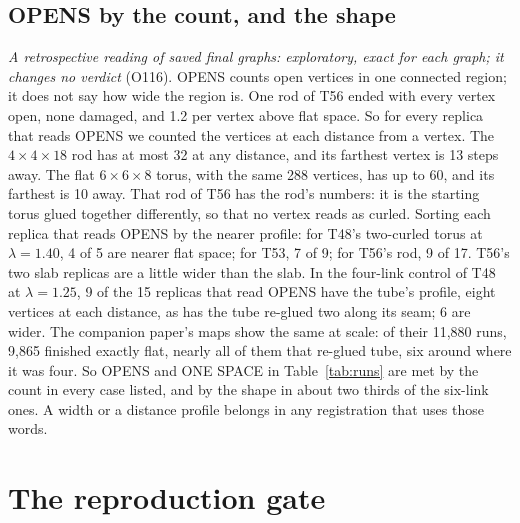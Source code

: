 \documentclass[aps,pre,10pt,twocolumn,superscriptaddress,nofootinbib]{revtex4-2}
\begin{document}
\subsection{OPENS by the count, and the shape}
\label{sec:shape}

\emph{A retrospective reading of saved final graphs: exploratory, exact for each graph; it changes no verdict}
(O116). OPENS counts open vertices in one connected region; it does not say how wide the region is. One rod of T56 ended with every vertex open, none damaged, and 1.2 per vertex above flat space. So for every
replica that reads OPENS we counted the vertices at each distance from a vertex. The $4 \times 4 \times 18$ rod has
at most 32 at any distance, and its farthest vertex is 13 steps away. The flat $6 \times 6 \times 8$ torus, with the
same 288 vertices, has up to 60, and its farthest is 10 away. That rod of T56 has the rod's numbers: it is the
starting torus glued together differently, so that no vertex reads as curled. Sorting each replica that reads OPENS
by the nearer profile: for T48's two-curled torus at $\lambda = 1.40$, 4 of 5 are nearer flat space; for T53, 7 of
9; for T56's rod, 9 of 17. T56's two slab replicas are a little wider than the slab. In the four-link control of T48
at $\lambda = 1.25$, 9 of the 15 replicas that read OPENS have the tube's profile, eight vertices at each distance,
as has the tube re-glued two along its seam; 6 are wider. The companion paper's maps show the same at scale: of
their 11,880 runs, 9,865 finished exactly flat, nearly all of them that re-glued tube, six around where it was four.
So OPENS and ONE SPACE in Table~\ref{tab:runs} are met
by the count in every case listed, and by the shape in about two thirds of the six-link ones. A width or a distance
profile belongs in any registration that uses those words.

\section{The reproduction gate}
\label{sec:gate}
\end{document}

